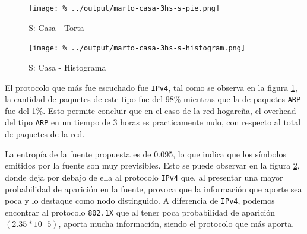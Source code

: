 \documentclass[final,inline,a4paper,narroweqnarray]{ieee}
\begin{document}

    \begin{figure}[ht]\begin{center}
      \texttt{[image: \%
      ../output/marto-casa-3hs-s-pie.png]}
      \vspace{-3em}
      \caption{S: Casa - Torta}
      \label{marto-casa-3hs-s-pie}
    \end{center}\end{figure}


    \begin{figure}[ht]\begin{center}
     \texttt{[image: \%
      ../output/marto-casa-3hs-s-histogram.png]}
      \caption{S: Casa - Histograma}
      \label{marto-casa-3hs-s-histogram}
    \end{center}\end{figure}

    El protocolo que más fue escuchado fue \texttt{IPv4}, tal como se
    observa en la figura \ref{marto-casa-3hs-s-pie}, la cantidad de
    paquetes  de este tipo fue del 98\% mientras que la de paquetes
    \texttt{ARP} fue del 1\%. Esto permite concluir que en el caso de
    la red hogareña, el overhead del tipo \texttt{ARP} en un tiempo
    de 3 horas es practicamente nulo, con respecto al total de
    paquetes de la red.

    La entropía de la fuente propuesta es de 0.095, lo que indica que los
    símbolos emitidos por la fuente son muy previsibles. Esto se puede
    observar en la figura \ref{marto-casa-3hs-s-histogram}, donde deja
    por debajo de ella al protocolo \texttt{IPv4} que, al presentar una
    mayor probabilidad de aparición en la fuente, provoca que la información que aporte sea
    poca y lo destaque como nodo distinguido. A diferencia de
    \texttt{IPv4}, podemos encontrar al protocolo \texttt{802.1X} que al
    tener poca probabilidad de aparición $(2.35 * 10^-5)$, aporta mucha
    información, siendo el protocolo que más aporta.
      
    
\end{document}
